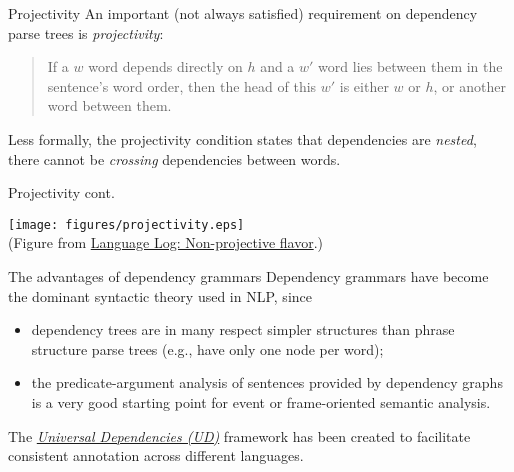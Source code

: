 \documentclass[style=upen, size=14pt]{powerdot}
\theoremstyle{definition}
\begin{document}
\begin{slide}{Projectivity}
  An important (not always satisfied) requirement on dependency parse trees is 
  \emph{projectivity}:
  \begin{quote}
    If a $w$ word depends directly on $h$ and a $w'$ word lies between them in
    the sentence's word order, then the head of this $w'$ is either $w$ or $h$,
    or another word between them.
  \end{quote}
  Less formally, the projectivity condition states that dependencies are
  \emph{nested}, there cannot be \emph{crossing} dependencies between words.
\end{slide}

\begin{slide}[toc=]{Projectivity cont.}
    \begin{center}
      \texttt{[image: figures/projectivity.eps]}\\
      \footnotesize{(Figure from
        \href{https://languagelog.ldc.upenn.edu/nll/?p=7851}{Language Log:
          Non-projective flavor}.)}
  \end{center}
\end{slide}

\begin{slide}[toc=Dep. advantages]{The advantages of dependency grammars}
  Dependency grammars have become the dominant syntactic theory used in NLP,
  since
  \begin{itemize}
  \item dependency trees are in many respect simpler structures than phrase
    structure parse trees (e.g., have only one node per word);
  \item the predicate-argument analysis of sentences provided by dependency
    graphs is a very good starting point for event or frame-oriented semantic
    analysis.
  \end{itemize}

  The \href{https://universaldependencies.org/}{\emph{Universal Dependencies (UD)}}
  framework has been created to facilitate consistent annotation across different
  languages.
\end{slide}
\end{document}
